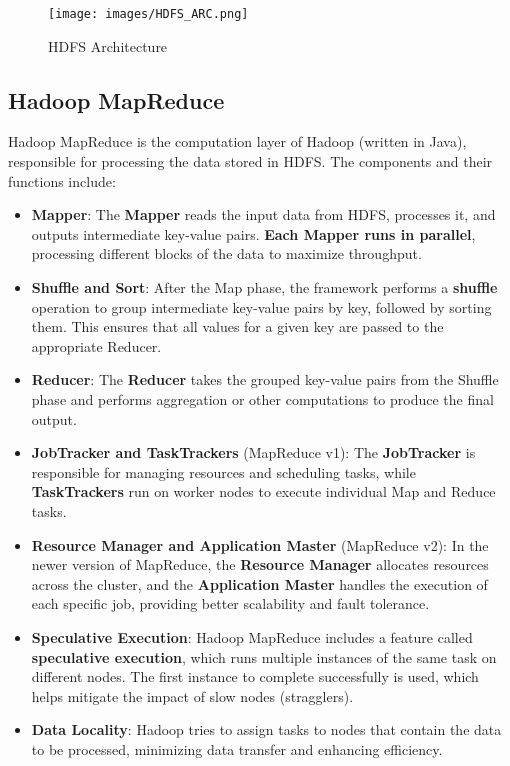\documentclass[12pt]{article}
\begin{document}
\begin{figure}[h!]
    \centering
    \texttt{[image: images/HDFS\_ARC.png]}
    \caption{HDFS Architecture}
    \label{fig:hdfs}
\end{figure}

\subsection{Hadoop MapReduce}
Hadoop MapReduce is the computation layer of Hadoop (written in Java), responsible for processing the data stored in HDFS. The components and their functions include:

\begin{itemize}
    \item \textbf{Mapper}: The \textbf{Mapper} reads the input data from HDFS, processes it, and outputs intermediate key-value pairs. \textbf{Each Mapper runs in parallel}, processing different blocks of the data to maximize throughput.
    
    \item \textbf{Shuffle and Sort}: After the Map phase, the framework performs a \textbf{shuffle} operation to group intermediate key-value pairs by key, followed by sorting them. This ensures that all values for a given key are passed to the appropriate Reducer.
    
    \item \textbf{Reducer}: The \textbf{Reducer} takes the grouped key-value pairs from the Shuffle phase and performs aggregation or other computations to produce the final output.

    \item \textbf{JobTracker and TaskTrackers} (MapReduce v1): The \textbf{JobTracker} is responsible for managing resources and scheduling tasks, while \textbf{TaskTrackers} run on worker nodes to execute individual Map and Reduce tasks.
    
    \item \textbf{Resource Manager and Application Master} (MapReduce v2): In the newer version of MapReduce, the \textbf{Resource Manager} allocates resources across the cluster, and the \textbf{Application Master} handles the execution of each specific job, providing better scalability and fault tolerance.
    
    \item \textbf{Speculative Execution}: Hadoop MapReduce includes a feature called \textbf{speculative execution}, which runs multiple instances of the same task on different nodes. The first instance to complete successfully is used, which helps mitigate the impact of slow nodes (stragglers).
    
    \item \textbf{Data Locality}: Hadoop tries to assign tasks to nodes that contain the data to be processed, minimizing data transfer and enhancing efficiency.
\end{itemize}
\end{document}
